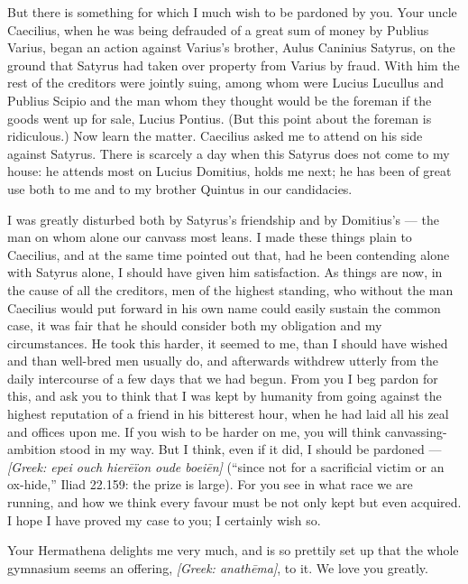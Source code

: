  But there is something for which I much wish to be pardoned by you. Your uncle Caecilius, when he was being defrauded of a great sum of money by Publius Varius, began an action against Varius's brother, Aulus Caninius Satyrus, on the ground that Satyrus had taken over property from Varius by fraud. With him the rest of the creditors were jointly suing, among whom were Lucius Lucullus and Publius Scipio and the man whom they thought would be the foreman if the goods went up for sale, Lucius Pontius. (But this point about the foreman is ridiculous.) Now learn the matter. Caecilius asked me to attend on his side against Satyrus. There is scarcely a day when this Satyrus does not come to my house: he attends most on Lucius Domitius, holds me next; he has been of great use both to me and to my brother Quintus in our candidacies.

 I was greatly disturbed both by Satyrus's friendship and by Domitius's --- the man on whom alone our canvass most leans. I made these things plain to Caecilius, and at the same time pointed out that, had he been contending alone with Satyrus alone, I should have given him satisfaction. As things are now, in the cause of all the creditors, men of the highest standing, who without the man Caecilius would put forward in his own name could easily sustain the common case, it was fair that he should consider both my obligation and my circumstances. He took this harder, it seemed to me, than I should have wished and than well-bred men usually do, and afterwards withdrew utterly from the daily intercourse of a few days that we had begun. From you I beg pardon for this, and ask you to think that I was kept by humanity from going against the highest reputation of a friend in his bitterest hour, when he had laid all his zeal and offices upon me. If you wish to be harder on me, you will think canvassing-ambition stood in my way. But I think, even if it did, I should be pardoned --- \textit{[Greek: epei ouch hierēïon oude boeiēn]} (``since not for a sacrificial victim or an ox-hide,'' Iliad 22.159: the prize is large). For you see in what race we are running, and how we think every favour must be not only kept but even acquired. I hope I have proved my case to you; I certainly wish so.

 Your Hermathena delights me very much, and is so prettily set up that the whole gymnasium seems an offering, \textit{[Greek: anath\=ema]}, to it. We love you greatly.
